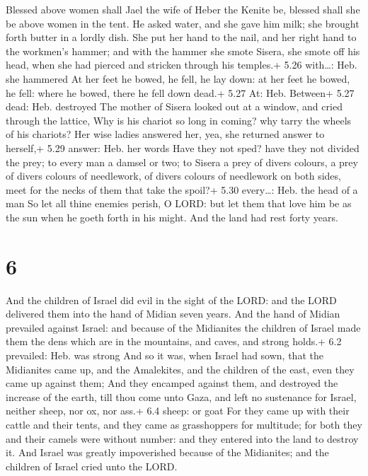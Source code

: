  Blessed above women shall Jael the wife of Heber the
Kenite be, blessed shall she be above women in the tent. 
He asked water, and she gave him milk; she brought forth butter in a
lordly dish.  She put her hand to the nail, and her right
hand to the workmen's hammer; and with the hammer she smote Sisera, she
smote off his head, when she had pierced and stricken through his
temples.+ 5.26 with\ldots: Heb. she hammered  At her feet
he bowed, he fell, he lay down: at her feet he bowed, he fell: where he
bowed, there he fell down dead.+ 5.27 At: Heb. Between+ 5.27 dead: Heb.
destroyed  The mother of Sisera looked out at a window, and
cried through the lattice, Why is his chariot so long in coming? why
tarry the wheels of his chariots?  Her wise ladies answered
her, yea, she returned answer to herself,+ 5.29 answer: Heb. her words
 Have they not sped? have they not divided the prey; to
every man a damsel or two; to Sisera a prey of divers colours, a prey of
divers colours of needlework, of divers colours of needlework on both
sides, meet for the necks of them that take the spoil?+ 5.30
every\ldots: Heb. the head of a man  So let all thine
enemies perish, O LORD: but let them that love him be as the sun when he
goeth forth in his might. And the land had rest forty years.

\hypertarget{section-5}{%
\section{6}\label{section-5}}

 And the children of Israel did evil in the sight of the
LORD: and the LORD delivered them into the hand of Midian seven years.
 And the hand of Midian prevailed against Israel: and
because of the Midianites the children of Israel made them the dens
which are in the mountains, and caves, and strong holds.+ 6.2 prevailed:
Heb. was strong  And so it was, when Israel had sown, that
the Midianites came up, and the Amalekites, and the children of the
east, even they came up against them;  And they encamped
against them, and destroyed the increase of the earth, till thou come
unto Gaza, and left no sustenance for Israel, neither sheep, nor ox, nor
ass.+ 6.4 sheep: or goat  For they came up with their cattle
and their tents, and they came as grasshoppers for multitude; for both
they and their camels were without number: and they entered into the
land to destroy it.  And Israel was greatly impoverished
because of the Midianites; and the children of Israel cried unto the
LORD.

